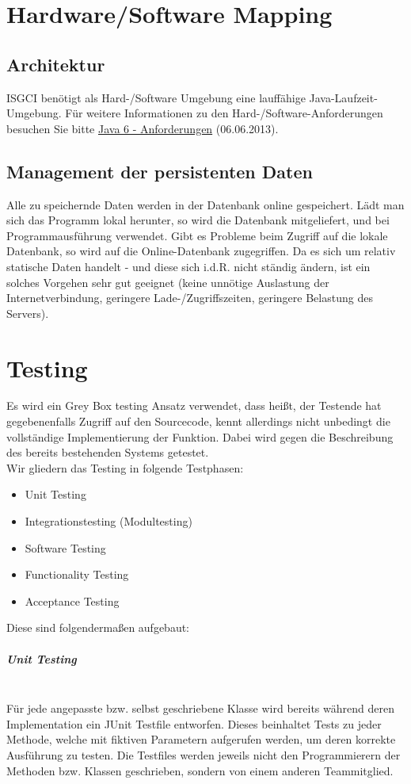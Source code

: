 \documentclass[10pt,a4paper]{article}
\begin{document}
\newpage
\section{Hardware/Software Mapping}
\subsection{Architektur}
ISGCI benötigt als Hard-/Software Umgebung eine lauffähige Java-Laufzeit-Umgebung. Für weitere Informationen zu den Hard-/Software-Anforderungen besuchen Sie bitte 
\href{http://www.oracle.com/technetwork/java/javase/system-configurations-135212.html}{Java 6 - Anforderungen} (06.06.2013).

\subsection{Management der persistenten Daten}
Alle zu speichernde Daten werden in der Datenbank online gespeichert. Lädt man sich das Programm lokal herunter, so wird die Datenbank mitgeliefert, und bei Programmausführung verwendet. Gibt es Probleme beim Zugriff auf die lokale Datenbank, so wird auf die Online-Datenbank zugegriffen. Da es sich um relativ statische Daten handelt - und diese sich i.d.R. nicht ständig ändern, ist ein solches Vorgehen sehr gut geeignet (keine unnötige Auslastung der Internetverbindung, geringere Lade-/Zugriffszeiten, geringere Belastung des Servers). 


\newpage
\section{Testing}
Es wird ein Grey Box testing Ansatz verwendet, dass heißt, der Testende hat gegebenenfalls Zugriff auf den Sourcecode, kennt allerdings nicht unbedingt die vollständige Implementierung der Funktion. Dabei wird gegen die Beschreibung des bereits bestehenden Systems getestet.\\
Wir gliedern das Testing in folgende Testphasen:
\begin{itemize}
\item Unit Testing
\item Integrationstesting (Modultesting)
\item Software Testing
\item Functionality Testing
\item Acceptance Testing
\end{itemize}
Diese sind folgendermaßen aufgebaut:
\subparagraph{Unit Testing}\ \\
Für jede angepasste bzw. selbst geschriebene Klasse wird bereits während deren Implementation ein JUnit Testfile entworfen. Dieses beinhaltet Tests zu jeder Methode, welche mit fiktiven Parametern aufgerufen werden, um deren korrekte Ausführung zu testen. Die Testfiles werden jeweils nicht den Programmierern der Methoden bzw. Klassen geschrieben, sondern von einem anderen Teammitglied. 
\end{document}
